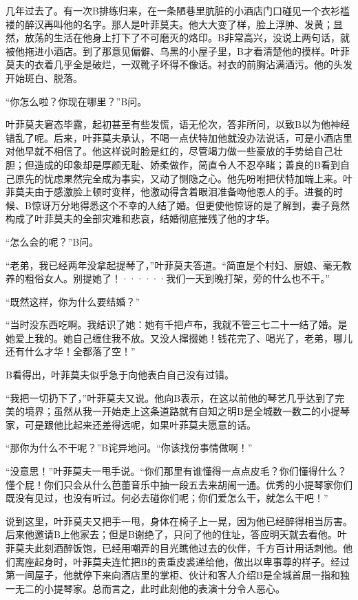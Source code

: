 \documentclass[12pt, UTF8]{ctexbook}
\begin{document}
\par 几年过去了。有一次B排练归来，在一条陋巷里肮脏的小酒店门口碰见一个衣衫褴褛的醉汉再叫他的名字。那人是叶菲莫夫。他大大变了样，脸上浮肿、发黄；显然，放荡的生活在他身上打下了不可磨灭的烙印。B非常高兴，没说上两句话，就被他拖进小酒店。到了那意见偏僻、乌黑的小屋子里，B才看清楚他的摸样。叶菲莫夫的衣着几乎全是破烂，一双靴子坏得不像话。衬衣的前胸沾满酒污。他的头发开始斑白、脱落。
\par “你怎么啦？你现在哪里？”B问。
\par 叶菲莫夫窘态毕露，起初甚至有些发慌，语无伦次，答非所问，以致B以为他神经错乱了呢。后来，叶菲莫夫承认，不喝一点伏特加他就没办法说话，可是小酒店里对他早就不相信了。他这样说时脸是红的，尽管竭力做一些豪放的手势给自己壮胆；但造成的印象却是厚颜无耻、娇柔做作，简直令人不忍卒睹；善良的B看到自己原先的忧虑果然完全成为事实，又动了恻隐之心。他先吩咐把伏特加端上来。叶菲莫夫由于感激脸上顿时变样，他激动得含着眼泪准备吻他恩人的手。进餐的时候、B惊讶万分地得悉这个不幸的人结了婚。但更使他惊讶的是了解到，妻子竟然构成了叶菲莫夫的全部灾难和悲哀，结婚彻底摧残了他的才华。
\par “怎么会的呢？”B问。
\par “老弟，我已经两年没拿起提琴了，”叶菲莫夫答道。“简直是个村妇、厨娘、毫无教养的粗俗女人。别提她了！······我们一天到晚打架，旁的什么也不干。”
\par “既然这样，你为什么要结婚？”
\par “当时没东西吃啊。我结识了她：她有千把卢布，我就不管三七二十一结了婚。是她爱上我的。她自己缠住我不放。又没人撺掇她！钱花完了、喝光了，老弟，哪儿还有什么才华！全都落了空！”
\par B看得出，叶菲莫夫似乎急于向他表白自己没有过错。
\par “我把一切扔下了，”叶菲莫夫又说。他向B表示，在这以前他的琴艺几乎达到了完美的境界；虽然从我一开始走上这条道路就有自知之明B是全城数一数二的小提琴家，可是跟他比起来还差得远呢，如果叶菲莫夫愿意的话。
\par “那你为什么不干呢？”B诧异地问。“你该找份事情做啊！”
\par “没意思！”叶菲莫夫一甩手说。“你们那里有谁懂得一点点皮毛？你们懂得什么？懂个屁！你们只会从什么芭蕾音乐中抽一段五去来胡闹一通。优秀的小提琴家你们既没有见过，也没有听过。何必去碰你们呢；你们爱怎么干，就怎么干吧！”
\par 说到这里，叶菲莫夫又把手一甩，身体在椅子上一晃，因为他已经醉得相当厉害。后来他邀请B上他家去；但是B谢绝了，只问了他的住址，答应明天就去看他。叶菲莫夫此刻酒醉饭饱，已经用嘲弄的目光瞧他过去的伙伴，千方百计用话刺他。他们离座起身时，叶菲莫夫连忙把B的贵重皮裘递给他，做出以卑事尊的样子。经过第一间屋子，他就停下来向酒店里的掌柜、伙计和客人介绍B是全城首屈一指和独一无二的小提琴家。总而言之，此时此刻他的表演十分令人恶心。
\end{document}
